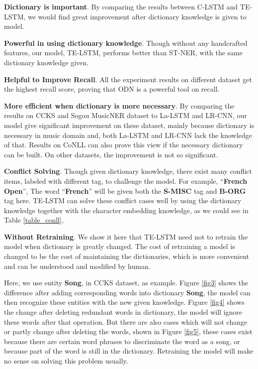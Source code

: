 \documentclass[letterpaper]{article} %
\begin{document}
\textbf{Dictionary is important}. By comparing the results between C-LSTM and TE-LSTM, we would find great improvement after dictionary knowledge is given to model.

\textbf{Powerful in using dictionary knowledge}. Though without any handcrafted features, our model, TE-LSTM, performs better than ST-NER, with the same dictionary knowledge given.

\textbf{Helpful to Improve Recall}. All the experiment results on different dataset get the highest recall score, proving that ODN is a powerful tool on recall.

\textbf{More efficient when dictionary is more necessary}. By comparing the results on CCKS and Sogou MusicNER dataset to La-LSTM and LR-CNN, our model give significant improvement on these dataset, mainly because dictionary is necessary in music domain and, both La-LSTM and LR-CNN lack the knowledge of that. Results on CoNLL can also prove this view if the necessary dictionary can be built. On other datasets, the improvement is not so significant.

\textbf{Conflict Solving}. Though given dictionary knowledge, there exist many conflict items, labeled with different tag, to challenge the model. For example,  ``\textbf{French Open}'', The word ``\textbf{French}'' will be given both the \textbf{S-MISC} tag and \textbf{B-ORG} tag here. TE-LSTM can solve these conflict cases well by using the dictionary knowledge together with the character embedding knowledge, as we could see in Table \ref{table_conll}, 

\textbf{Without Retraining}. We show it here that TE-LSTM need not to retrain the model when dictionary is greatly changed. The cost of retraining a model is changed to be the cost of maintaining the dictionaries, which is more convenient and can be understood and modified by human. 

Here, we use entity \textbf{Song}, in CCKS dataset, as example. Figure \ref{fig3} shows the difference after adding corresponding words into dictionary \textbf{Song}, the model can then recognize these entities with the new given knowledge. Figure \ref {fig4} shows the change after deleting redundant words in dictionary, the model will ignore these words after that operation. But there are also cases which will not change or partly change after deleting the words, shown in Figure \ref{fig5}, these cases exist because there are certain word phrases to discriminate the word as a song,  or because part of the word is still in the dictionary. Retraining the model will make no sense on solving this problem usually.
\end{document}
